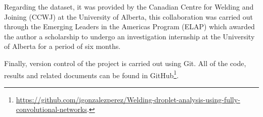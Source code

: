 Regarding the dataset, it was provided by the Canadian Centre for Welding and Joining (CCWJ) at the University of Alberta, this collaboration was carried out through the Emerging Leaders in the Americas Program (ELAP) which awarded the author a scholarship to undergo an investigation internship at the University of Alberta for a period of six months.

Finally, version control of the project is carried out using Git. All of the code, results and related documents can be found in GitHub\footnote{\url{https://github.com/igonzalezperez/Welding-droplet-analysis-using-fully-convolutional-networks}.}.